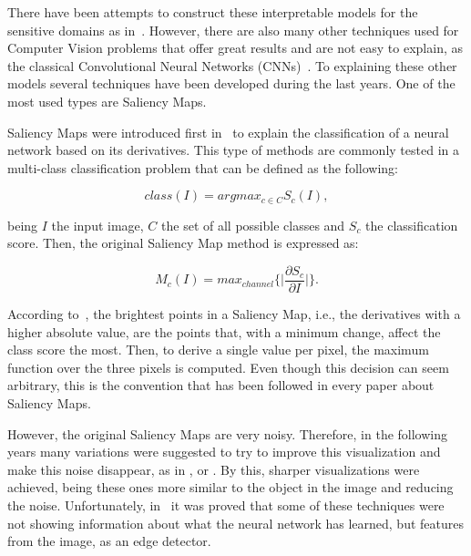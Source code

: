 \documentclass[preprint,12pt]{elsarticle}
\begin{document}
There have been attempts to construct these interpretable models for the sensitive domains as in~\cite{singhThinkPositiveInterpretable2022}. However, there are also many other techniques used for Computer Vision problems that offer great results and are not easy to explain, as the classical Convolutional Neural Networks (CNNs)~\cite{lecunConvolutionalNetworksImages}. To explaining these other models  several techniques have been developed during the last years. One of the most used types are Saliency Maps.

Saliency Maps were introduced first in~\cite{simonyanDeepConvolutionalNetworks2014a} to explain the classification of a neural network based on its derivatives. This type of methods are commonly tested in a multi-class classification problem that can be defined as the following:

\begin{equation}
    \label{eq: cnn output}
    class(I) = argmax_{c \in C}S_c(I),
\end{equation}

\noindent
being $I$ the input image, $C$ the set of all possible classes and $S_c$ the classification score. Then, the original Saliency Map method is expressed as:

\begin{equation}
    \label{eq: saliency map}
    M_c(I) = max_{channel}\bigg \{ \bigg |\frac{\partial S_c}{\partial I} \bigg | \bigg \}.
\end{equation}

\noindent
According to~\cite{simonyanDeepConvolutionalNetworks2014a}, the brightest points in a Saliency Map, i.e., the derivatives with a higher absolute value, are the points that, with a minimum change, affect the class score the most. Then, to derive a single value per pixel, the maximum function over the three pixels is computed. Even though this decision can seem arbitrary, this is the convention that has been followed in every paper about Saliency Maps.

However, the original Saliency Maps are very noisy. Therefore, in the following years many variations were suggested to try to improve this visualization and make this noise disappear, as in \cite{springenbergStrivingSimplicityAll2015}, \cite{sundararajanAxiomaticAttributionDeep2017} or \cite{shrikumarNotJustBlack2017}. By this, sharper visualizations were achieved, being these ones more similar to the object in the image and reducing the noise. Unfortunately, in~\cite{adebayoSanityChecksSaliency2018} it was proved that some of these techniques were not showing information about what the neural network has learned, but features from the image, as an edge detector. 
\end{document}
